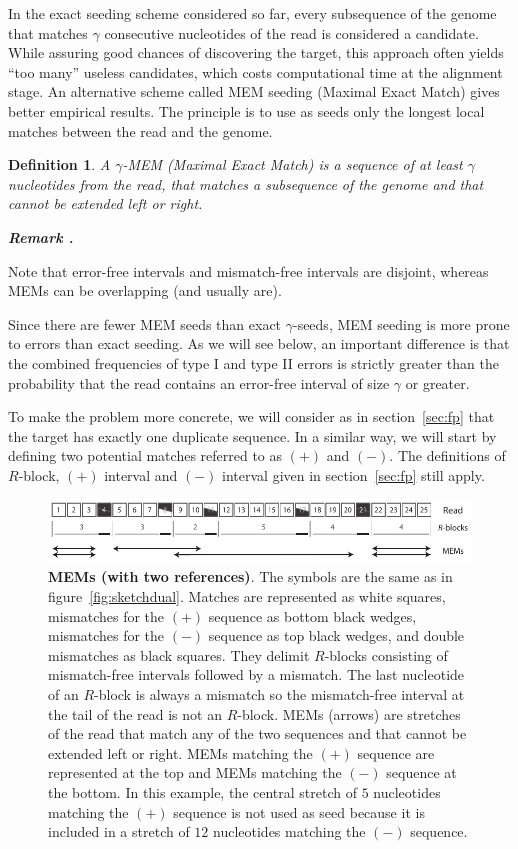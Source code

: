 \documentclass{article}
\newtheorem{definition}{Definition}
\newcounter{remarkcounter}
\newenvironment{remark}
{\small\it\vspace{0.5\baselineskip}
  \refstepcounter{remarkcounter}%
  \noindent\textbf{Remark \arabic{remarkcounter}.}%
}{\vspace{0.5\baselineskip}}
\begin{document}
In the exact seeding scheme considered so far, every subsequence of the
genome that matches $\gamma$ consecutive nucleotides of the read is
considered a candidate. While assuring good chances of discovering the
target, this approach often yields ``too many'' useless candidates, which
costs computational time at the alignment stage. An alternative scheme
called MEM seeding (Maximal Exact Match) gives better empirical results.
The principle is to use as seeds only the longest local matches between
the read and the genome.

\begin{definition}
A $\gamma$-MEM (Maximal Exact Match) is a sequence of at least $\gamma$
nucleotides from the read, that matches a subsequence of the genome and
that cannot be extended left or right.
\end{definition}

\begin{remark}
Note that error-free intervals and mismatch-free intervals are disjoint,
whereas MEMs can be overlapping (and usually are).
\end{remark}

Since there are fewer MEM seeds than exact $\gamma$-seeds, MEM seeding is
more prone to errors than exact seeding. As we will see below, an
important difference is that the combined frequencies of type I and type
II errors is strictly greater than the probability that the read contains
an error-free interval of size $\gamma$ or greater.


To make the problem more concrete, we will consider as in
section~\ref{sec:fp} that the target has exactly one duplicate sequence.
In a similar way, we will start by defining two potential matches referred
to as $(+)$ and $(-)$. The definitions of $R$-block, $(+)$ interval and
$(-)$ interval given in section~\ref{sec:fp} still apply.


\begin{figure}[h]
\centering
\includegraphics[scale=0.88]{sketch_MEM.pdf}
\caption{\textbf{MEMs (with two references)}. The symbols are the
same as in figure~\ref{fig:sketchdual}. Matches are represented as white
squares, mismatches for the $(+)$ sequence as bottom black wedges,
mismatches for the $(-)$ sequence as top black wedges, and double
mismatches as black squares. They delimit $R$-blocks consisting of
mismatch-free intervals followed by a mismatch. The last nucleotide of
an $R$-block is always a mismatch so the mismatch-free interval at the
tail of the read is not an $R$-block. MEMs (arrows) are stretches of the
read that match any of the two sequences and that cannot be extended left
or right. MEMs matching the $(+)$ sequence are represented at the top and
MEMs matching the $(-)$ sequence at the bottom. In this example, the
central stretch of $5$ nucleotides matching the $(+)$ sequence is not used
as seed because it is included in a stretch of $12$ nucleotides matching
the $(-)$ sequence.}
\label{fig:sketchmem}
\end{figure}
\end{document}
